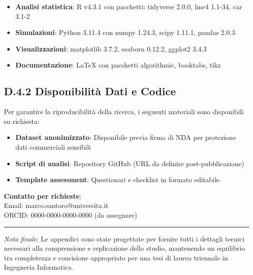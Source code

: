 \begin{itemize}
    \item \textbf{Analisi statistica}: R v4.3.1 con pacchetti: tidyverse 2.0.0, lme4 1.1-34, car 3.1-2
    \item \textbf{Simulazioni}: Python 3.11.4 con numpy 1.24.3, scipy 1.11.1, pandas 2.0.3
    \item \textbf{Visualizzazioni}: matplotlib 3.7.2, seaborn 0.12.2, ggplot2 3.4.3
    \item \textbf{Documentazione}: LaTeX con pacchetti algorithmic, booktabs, tikz
\end{itemize}

\subsection{D.4.2 Disponibilità Dati e Codice}

Per garantire la riproducibilità della ricerca, i seguenti materiali sono disponibili su richiesta:

\begin{itemize}
    \item \textbf{Dataset anonimizzato}: Disponibile previa firma di NDA per protezione dati commerciali sensibili
    \item \textbf{Script di analisi}: Repository GitHub (URL da definire post-pubblicazione)
    \item \textbf{Template assessment}: Questionari e checklist in formato editabile
\end{itemize}

\textbf{Contatto per richieste}: \\
Email: marco.santoro@universita.it \\
ORCID: 0000-0000-0000-0000 (da assegnare)

\vspace{1cm}

\noindent\rule{\textwidth}{0.4pt}

\textit{Nota finale}: Le appendici sono state progettate per fornire tutti i dettagli tecnici necessari alla comprensione e replicazione dello studio, mantenendo un equilibrio tra completezza e concisione appropriato per una tesi di laurea triennale in Ingegneria Informatica.